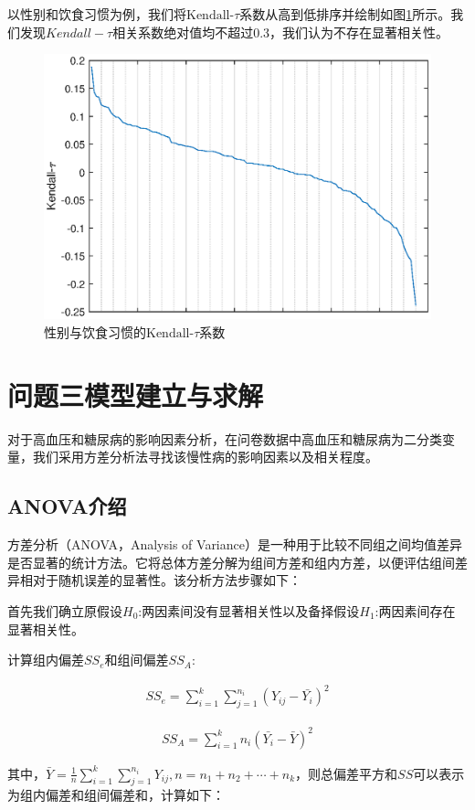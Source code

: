 \documentclass[withoutpreface,bwprint]{cumcmthesis} %
\begin{document}
以性别和饮食习惯为例，我们将$\text{Kendall-}\tau$系数从高到低排序并绘制如图\ref{3}所示。我们发现${Kendall-}\tau$相关系数绝对值均不超过0.3，我们认为不存在显著相关性。
\begin{figure}[H]
\centering
\includegraphics{figures/A1.eps}
\caption{性别与饮食习惯的$\text{Kendall-}\tau$系数}\label{3}
\end{figure}
\clearpage
\section{问题三模型建立与求解}
对于高血压和糖尿病的影响因素分析，在问卷数据中高血压和糖尿病为二分类变量，我们采用方差分析法寻找该慢性病的影响因素以及相关程度。
\subsection{ANOVA介绍}
方差分析（ANOVA，Analysis of Variance）是一种用于比较不同组之间均值差异是否显著的统计方法。它将总体方差分解为组间方差和组内方差，以便评估组间差异相对于随机误差的显著性。该分析方法步骤如下：

首先我们确立原假设$H_0$:两因素间没有显著相关性以及备择假设$H_1$:两因素间存在显著相关性。

计算组内偏差$SS_e$和组间偏差$SS_A$:

\begin{eqnarray}
SS_e=\sum_{i=1}^k\sum_{j=1}^{n_i}(Y_{ij}-\bar{Y_i})^2
\end{eqnarray}

\begin{eqnarray}
SS_A=\sum_{i=1}^kn_i(\bar{Y_i}-\bar{Y})^2
\end{eqnarray}

其中，$\bar{Y}=\frac{1}{n}\sum_{i=1}^{k}\sum_{j=1}^{n_i}Y_{ij},n=n_1+n_2+\cdots+n_k$，则总偏差平方和$SS$可以表示为组内偏差和组间偏差和，计算如下：
\end{document}
